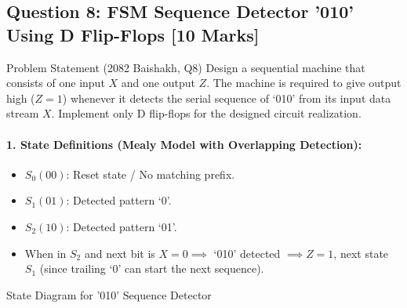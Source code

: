 \documentclass[11pt,a4paper,oneside]{book}
\begin{document}
\subsection{Question 8: FSM Sequence Detector '010' Using D Flip-Flops [10 Marks]}
\begin{questionbox}{Problem Statement (2082 Baishakh, Q8)}
Design a sequential machine that consists of one input $X$ and one output $Z$. The machine is required to give output high ($Z=1$) whenever it detects the serial sequence of `010' from its input data stream $X$. Implement only D flip-flops for the designed circuit realization.
\end{questionbox}

\paragraph{1. State Definitions (Mealy Model with Overlapping Detection):}
\begin{itemize}
  \item $S_0 (00)$: Reset state / No matching prefix.
  \item $S_1 (01)$: Detected pattern `0'.
  \item $S_2 (10)$: Detected pattern `01'.
  \item When in $S_2$ and next bit is $X=0 \implies$ `010' detected $\implies Z=1$, next state $S_1$ (since trailing `0' can start the next sequence).
\end{itemize}

\begin{schematicbox}{State Diagram for '010' Sequence Detector}
\centering
{}
\end{schematicbox}
\end{document}
